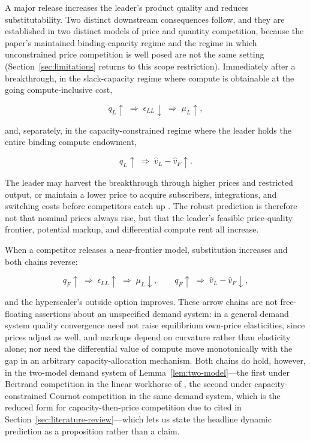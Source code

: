 \documentclass[11pt]{article}
\begin{document}
A major release increases the leader's product quality and reduces substitutability. Two distinct downstream consequences follow, and they are established in two distinct models of price and quantity competition, because the paper's maintained binding-capacity regime and the regime in which unconstrained price competition is well posed are not the same setting (Section~\ref{sec:limitations} returns to this scope restriction). Immediately after a breakthrough, in the slack-capacity regime where compute is obtainable at the going compute-inclusive cost,

\begin{equation}q_L\uparrow\;\Longrightarrow\;\epsilon_{LL}\downarrow\;\Longrightarrow\;\mu_L\uparrow,\end{equation}

and, separately, in the capacity-constrained regime where the leader holds the entire binding compute endowment,

\begin{equation}q_L\uparrow\;\Longrightarrow\;\widehat v_L-\widehat v_F\uparrow.\end{equation}

The leader may harvest the breakthrough through higher prices and restricted output, or maintain a lower price to acquire subscribers, integrations, and switching costs before competitors catch up \citep{klemperer1987}. The robust prediction is therefore not that nominal prices always rise, but that the leader's feasible price-quality frontier, potential markup, and differential compute rent all increase.

When a competitor releases a near-frontier model, substitution increases and both chains reverse:

\begin{equation}q_F\uparrow\;\Longrightarrow\;\epsilon_{LL}\uparrow\;\Longrightarrow\;\mu_L\downarrow,\qquad q_F\uparrow\;\Longrightarrow\;\widehat v_L-\widehat v_F\downarrow,\end{equation}

and the hyperscaler's outside option improves. These arrow chains are not free-floating assertions about an unspecified demand system: in a general demand system quality convergence need not raise equilibrium own-price elasticities, since prices adjust as well, and markups depend on curvature rather than elasticity alone; nor need the differential value of compute move monotonically with the gap in an arbitrary capacity-allocation mechanism. Both chains do hold, however, in the two-model demand system of Lemma~\ref{lem:two-model}---the first under Bertrand competition in the linear workhorse of \citet{singhVives1984}, the second under capacity-constrained Cournot competition in the same demand system, which is the reduced form for capacity-then-price competition due to \citet{krepsScheinkman1983} cited in Section~\ref{sec:literature-review}---which lets us state the headline dynamic prediction as a proposition rather than a claim.
\end{document}
